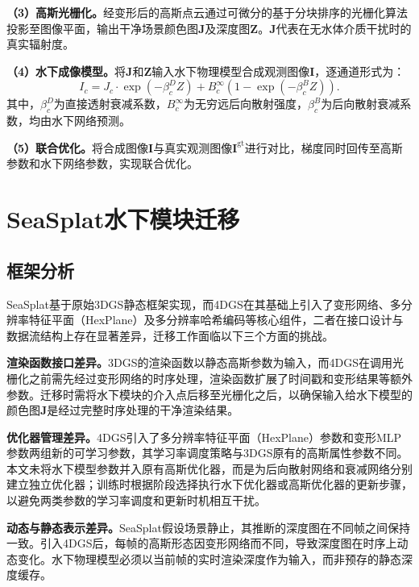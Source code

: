\textbf{（3）高斯光栅化。}经变形后的高斯点云通过可微分的基于分块排序的光栅化算法投影至图像平面，输出干净场景颜色图$\mathbf{J}$及深度图$\mathbf{Z}$。$\mathbf{J}$代表在无水体介质干扰时的真实辐射度。

\textbf{（4）水下成像模型。}将$\mathbf{J}$和$\mathbf{Z}$输入水下物理模型合成观测图像$\mathbf{I}$，逐通道形式为：
\begin{equation}
  I_c = J_c \cdot \exp\!\left(-\beta_c^D Z\right) + B_c^{\infty}\left(1 - \exp\!\left(-\beta_c^B Z\right)\right).
  \label{eq:uwmodel}
\end{equation}
其中，$\beta_c^D$为直接透射衰减系数，$B_c^{\infty}$为无穷远后向散射强度，$\beta_c^B$为后向散射衰减系数，均由水下网络预测。

\textbf{（5）联合优化。}将合成图像$\mathbf{I}$与真实观测图像$\mathbf{I}^{\mathrm{gt}}$进行对比，梯度同时回传至高斯参数和水下网络参数，实现联合优化。

\section{SeaSplat水下模块迁移}

\subsection{框架分析}

SeaSplat基于原始3DGS静态框架实现，而4DGS在其基础上引入了变形网络、多分辨率特征平面（HexPlane）及多分辨率哈希编码等核心组件，二者在接口设计与数据流结构上存在显著差异，迁移工作面临以下三个方面的挑战。

\textbf{渲染函数接口差异。}3DGS的渲染函数以静态高斯参数为输入，而4DGS在调用光栅化之前需先经过变形网络的时序处理，渲染函数扩展了时间戳和变形结果等额外参数。迁移时需将水下模块的介入点后移至光栅化之后，以确保输入给水下模型的颜色图$\mathbf{J}$是经过完整时序处理的干净渲染结果。

\textbf{优化器管理差异。}4DGS引入了多分辨率特征平面（HexPlane）参数和变形MLP参数两组新的可学习参数，其学习率调度策略与3DGS原有的高斯属性参数不同。本文未将水下模型参数并入原有高斯优化器，而是为后向散射网络和衰减网络分别建立独立优化器；训练时根据阶段选择执行水下优化器或高斯优化器的更新步骤，以避免两类参数的学习率调度和更新时机相互干扰。

\textbf{动态与静态表示差异。}SeaSplat假设场景静止，其推断的深度图在不同帧之间保持一致。引入4DGS后，每帧的高斯形态因变形网络而不同，导致深度图在时序上动态变化。水下物理模型必须以当前帧的实时渲染深度作为输入，而非预存的静态深度缓存。

